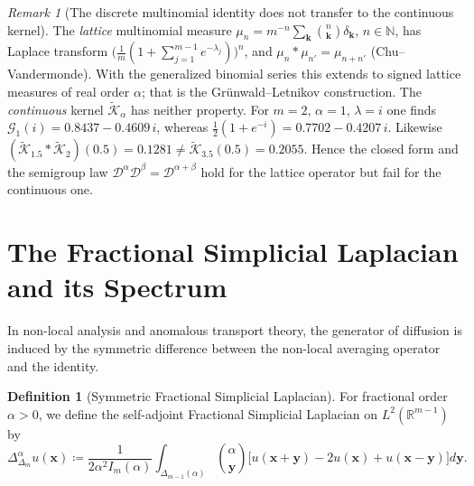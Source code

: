 \documentclass[11pt,a4paper]{article}
\theoremstyle{plain}
\theoremstyle{definition}
\newtheorem{definition}[theorem]{Definition}
\theoremstyle{remark}
\newtheorem{remark}[theorem]{Remark}
\numberwithin{equation}{section}
\begin{document}
\begin{remark}[The discrete multinomial identity does not transfer to the continuous kernel]
\label{rem:no_semigroup}
The \emph{lattice} multinomial measure $\mu_n = m^{-n}\sum_{\mathbf{k}} \binom{n}{\mathbf{k}} \delta_{\mathbf{k}}$, $n \in \mathbb{N}$, has Laplace transform $\big(\tfrac{1}{m}(1 + \sum_{j=1}^{m-1} e^{-\lambda_j})\big)^n$, and $\mu_n * \mu_{n'} = \mu_{n+n'}$ (Chu--Vandermonde). With the generalized binomial series this extends to signed lattice measures of real order $\alpha$; that is the Gr\"unwald--Letnikov construction. The \emph{continuous} kernel $\widetilde{\mathcal{K}}_\alpha$ has neither property. For $m = 2$, $\alpha = 1$, $\lambda = i$ one finds $\mathcal{G}_1(i) = 0.8437 - 0.4609\,i$, whereas $\tfrac12(1+e^{-i}) = 0.7702 - 0.4207\,i$. Likewise $(\widetilde{\mathcal{K}}_{1.5} * \widetilde{\mathcal{K}}_{2})(0.5) = 0.1281 \ne \widetilde{\mathcal{K}}_{3.5}(0.5) = 0.2055$. Hence the closed form and the semigroup law $\mathcal{D}^\alpha\mathcal{D}^\beta = \mathcal{D}^{\alpha+\beta}$ hold for the lattice operator but fail for the continuous one.
\end{remark}

\section{The Fractional Simplicial Laplacian and its Spectrum}

In non-local analysis and anomalous transport theory, the generator of diffusion is induced by the symmetric difference between the non-local averaging operator and the identity.

\begin{definition}[Symmetric Fractional Simplicial Laplacian]
For fractional order $\alpha > 0$, we define the self-adjoint Fractional Simplicial Laplacian on $L^2(\mathbb{R}^{m-1})$ by
\begin{equation}
\Delta_{\Delta_m}^\alpha u(\mathbf{x}) \coloneqq \frac{1}{2\alpha^2 I_m(\alpha)}\int_{\Delta_{m-1}(\alpha)} \binom{\alpha}{\mathbf{y}} \Big[u(\mathbf{x}+\mathbf{y}) - 2u(\mathbf{x}) + u(\mathbf{x}-\mathbf{y})\Big] d\mathbf{y}.
\end{equation}
\end{definition}
\end{document}
